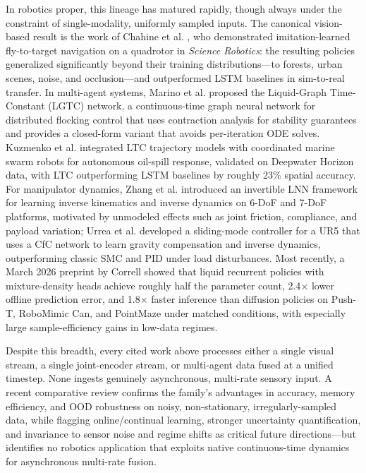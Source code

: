 \documentclass[conference]{IEEEtran}
\begin{document}
In robotics proper, this lineage has matured rapidly, though always under the constraint of single-modality, uniformly sampled inputs. The canonical vision-based result is the work of Chahine et al. \cite{chahine2023flight}, who demonstrated imitation-learned fly-to-target navigation on a quadrotor in \emph{Science Robotics}: the resulting policies generalized significantly beyond their training distributions---to forests, urban scenes, noise, and occlusion---and outperformed LSTM baselines in sim-to-real transfer. In multi-agent systems, Marino et al. \cite{marino2024lgtc} proposed the Liquid-Graph Time-Constant (LGTC) network, a continuous-time graph neural network for distributed flocking control that uses contraction analysis for stability guarantees and provides a closed-form variant that avoids per-iteration ODE solves. Kuzmenko et al. \cite{kuzmenko2025oil} integrated LTC trajectory models with coordinated marine swarm robots for autonomous oil-spill response, validated on Deepwater Horizon data, with LTC outperforming LSTM baselines by roughly 23\% spatial accuracy. For manipulator dynamics, Zhang et al. \cite{zhang2025invertible} introduced an invertible LNN framework for learning inverse kinematics and inverse dynamics on 6-DoF and 7-DoF platforms, motivated by unmodeled effects such as joint friction, compliance, and payload variation; Urrea et al. \cite{urrea2024smc} developed a sliding-mode controller for a UR5 that uses a CfC network to learn gravity compensation and inverse dynamics, outperforming classic SMC and PID under load disturbances. Most recently, a March 2026 preprint by Correll \cite{correll2026liquid} showed that liquid recurrent policies with mixture-density heads achieve roughly half the parameter count, 2.4$\times$ lower offline prediction error, and 1.8$\times$ faster inference than diffusion policies on Push-T, RoboMimic Can, and PointMaze under matched conditions, with especially large sample-efficiency gains in low-data regimes.

Despite this breadth, every cited work above processes either a single visual stream, a single joint-encoder stream, or multi-agent data fused at a unified timestep. None ingests genuinely asynchronous, multi-rate sensory input. A recent comparative review \cite{zong2025comparative} confirms the family's advantages in accuracy, memory efficiency, and OOD robustness on noisy, non-stationary, irregularly-sampled data, while flagging online/continual learning, stronger uncertainty quantification, and invariance to sensor noise and regime shifts as critical future directions---but identifies no robotics application that exploits native continuous-time dynamics for asynchronous multi-rate fusion.
\end{document}
